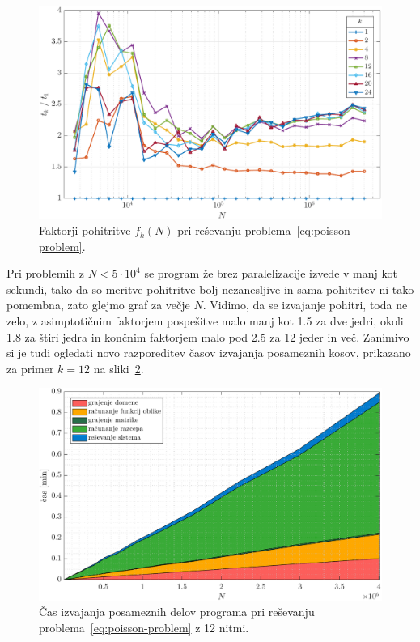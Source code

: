 \documentclass[12pt,a4paper,twoside]{article}
\theoremstyle{definition} %
\theoremstyle{plain} %
\numberwithin{equation}{section}
\newlength{\iw}
\begin{document}
\begin{figure}[!h]
  \centering
  \includegraphics[width=\iw]{images/poisson_square_speedup.pdf}
  \caption[Faktorji pohitritve pri reševanju Poissonove enačbe.]{Faktorji pohitritve $f_k(N)$ pri
  reševanju problema~\eqref{eq:poisson-problem}.}
  \label{fig:poisson-square-speedup}
\end{figure}
Pri problemih z $N < 5\cdot 10^4$ se program že brez paralelizacije izvede v manj kot sekundi, tako
da so meritve pohitritve bolj nezanesljive in sama pohitritev ni tako pomembna, zato glejmo graf za
večje $N$. Vidimo, da se izvajanje pohitri, toda ne zelo, z asimptotičnim faktorjem pospešitve malo manj kot
1.5 za dve jedri, okoli 1.8 za štiri jedra in končnim faktorjem malo pod 2.5 za 12 jeder in več.
Zanimivo si je tudi ogledati novo razporeditev časov izvajanja posameznih kosov, prikazano za primer
$k =12$ na sliki~\ref{fig:poisson-square-time-distribution-12}.

\begin{figure}[!h]
  \centering
  \includegraphics[width=\iw]{images/poisson_square_time_distribution_12.pdf}
  \caption[Čas izvajanja delov programa pri uporabi 12 niti.]{Čas izvajanja posameznih delov programa pri reševanju
  problema~\eqref{eq:poisson-problem} z 12 nitmi.}
  \label{fig:poisson-square-time-distribution-12}
\end{figure}
\end{document}

